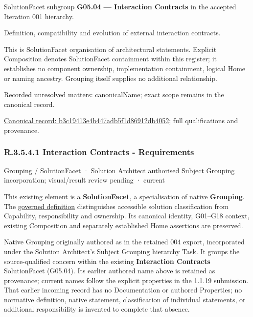 SolutionFacet subgroup \textbf{G05.04 — Interaction Contracts} in the accepted Iteration 001 hierarchy.



Definition, compatibility and evolution of external interaction contracts.



This is SolutionFacet organisation of architectural statements. Explicit Composition denotes SolutionFacet containment within this register; it establishes no component ownership, implementation containment, logical Home or naming ancestry. Grouping itself supplies no additional relationship.


{\small Recorded unresolved matters: canonicalName; exact scope remains in the canonical record.}\par
{\footnotesize \href{../../../../../../../continuum/grouping/b3c19413e4b447adb5f1d86912db4052.md}{Canonical record: b3c19413e4b447adb5f1d86912db4052}; full qualifications and provenance.}\par
\subsubsection*{R.3.5.4.1 Interaction Contracts - Requirements}
\label{navigation:R.3.5.4.1}

\label{element:55441c2677144a9da1c6348e633eaac8}
{\small Grouping / SolutionFacet · Solution Architect authorised Subject Grouping incorporation; visual/result review pending · current}\par

This existing element is a \textbf{SolutionFacet}, a specialisation of native
\textbf{Grouping}. The \href{\detokenize{../../../../../../../governance/continuum-representation.md#solutionfacet-classification--1119-candidate}}{governed definition}
distinguishes accessible solution classification from Capability, responsibility
and ownership. Its canonical identity, G01–G18 context, existing Composition
and separately established Home assertions are preserved.



Native Grouping originally authored as \texttt{} in the retained 004 export,
incorporated under the Solution Architect's Subject Grouping hierarchy Task.
It groups the source-qualified \texttt{} concern within
the existing \textbf{Interaction Contracts} SolutionFacet (G05.04). Its earlier authored name above is retained as provenance; current names
follow the explicit properties in the 1.1.19 submission.
That earlier incoming record has no Documentation or authored Properties; no normative
definition, native statement, classification of individual statements, or
additional responsibility is invented to complete that absence.



